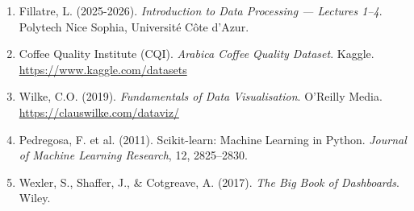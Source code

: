 \documentclass[12pt,a4paper]{article}
\begin{document}
\begin{enumerate}
  \item Fillatre, L. (2025-2026). \textit{Introduction to Data Processing — Lectures 1--4}.
        Polytech Nice Sophia, Université Côte d'Azur.
  \item Coffee Quality Institute (CQI). \textit{Arabica Coffee Quality Dataset}.
        Kaggle. \url{https://www.kaggle.com/datasets}
  \item Wilke, C.O. (2019). \textit{Fundamentals of Data Visualisation}.
        O'Reilly Media. \url{https://clauswilke.com/dataviz/}
  \item Pedregosa, F. et al. (2011). Scikit-learn: Machine Learning in Python.
        \textit{Journal of Machine Learning Research}, 12, 2825--2830.
  \item Wexler, S., Shaffer, J., \& Cotgreave, A. (2017).
        \textit{The Big Book of Dashboards}. Wiley.
\end{enumerate}
\end{document}
